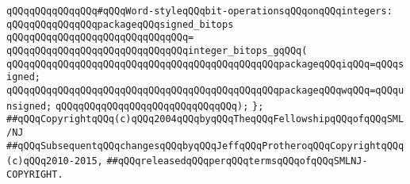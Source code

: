 \newline
\verb|qQQqqQQqqQQqqQQq#qQQqWord-styleqQQqbit-operationsqQQqonqQQqintegers:|\newline
\verb|qQQqqQQqqQQqqQQqpackageqQQqsigned_bitops|\newline
\verb|qQQqqQQqqQQqqQQqqQQqqQQqqQQqqQQq=|\newline
\verb|qQQqqQQqqQQqqQQqqQQqqQQqqQQqqQQqinteger_bitops_gqQQq(|\newline
\verb|qQQqqQQqqQQqqQQqqQQqqQQqqQQqqQQqqQQqqQQqqQQqqQQqpackageqQQqiqQQq=qQQqsigned;|\newline
\verb|qQQqqQQqqQQqqQQqqQQqqQQqqQQqqQQqqQQqqQQqqQQqqQQqpackageqQQqwqQQq=qQQqunsigned;|\newline
\verb|qQQqqQQqqQQqqQQqqQQqqQQqqQQqqQQq);|\newline
\verb|};|\newline
\newline
\newline
\verb|##qQQqCopyrightqQQq(c)qQQq2004qQQqbyqQQqTheqQQqFellowshipqQQqofqQQqSML/NJ|\newline
\verb|##qQQqSubsequentqQQqchangesqQQqbyqQQqJeffqQQqProtheroqQQqCopyrightqQQq(c)qQQq2010-2015,|\newline
\verb|##qQQqreleasedqQQqperqQQqtermsqQQqofqQQqSMLNJ-COPYRIGHT.|\newline

